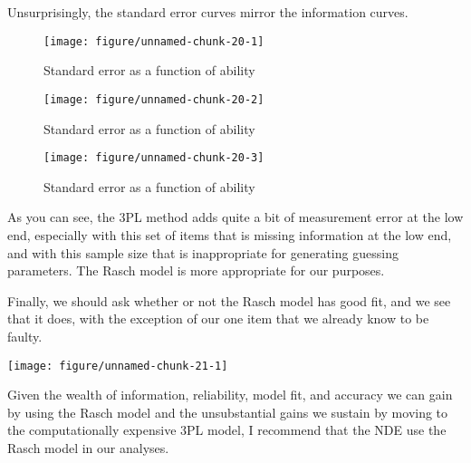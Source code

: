 \documentclass{article}\usepackage[]{graphicx}\usepackage[]{color}
\makeatletter
\def\maxwidth{ %
  \ifdim\Gin@nat@width>\linewidth
    \linewidth
  \else
    \Gin@nat@width
  \fi
}
\newenvironment{knitrout}{}{} %
\makeatother
\begin{document}
\begin{enumerate}
\centering

\raggedright
Unsurprisingly, the standard error curves mirror the information curves.

\centering
\begin{knitrout}
\color{fgcolor}\begin{figure}[H]

{\centering \texttt{[image: figure/unnamed-chunk-20-1]} 

}

\caption[Standard error as a function of ability]{Standard error as a function of ability}\label{fig:unnamed-chunk-201}
\end{figure}

\begin{figure}[H]

{\centering \texttt{[image: figure/unnamed-chunk-20-2]} 

}

\caption[Standard error as a function of ability]{Standard error as a function of ability}\label{fig:unnamed-chunk-202}
\end{figure}

\begin{figure}[H]

{\centering \texttt{[image: figure/unnamed-chunk-20-3]} 

}

\caption[Standard error as a function of ability]{Standard error as a function of ability}\label{fig:unnamed-chunk-203}
\end{figure}


\end{knitrout}
\raggedright
As you can see, the 3PL method adds quite a bit of measurement error at the low end, especially with this set of items that is missing information at the low end, and with this sample size that is inappropriate for generating guessing parameters. The Rasch model is more appropriate for our purposes. 
\raggedright

Finally, we should ask whether or not the Rasch model has good fit, and we see that it does, with the exception of our one item that we already know to be faulty.

\centering
\begin{knitrout}
\color{fgcolor}

{\centering \texttt{[image: figure/unnamed-chunk-21-1]} 

}



\end{knitrout}
\raggedright
Given the wealth of information, reliability, model fit, and accuracy we can gain by using the Rasch model and the unsubstantial gains we sustain by moving to the computationally expensive 3PL model, I recommend that the NDE use the Rasch model in our analyses.

\end{enumerate}
\end{document}
